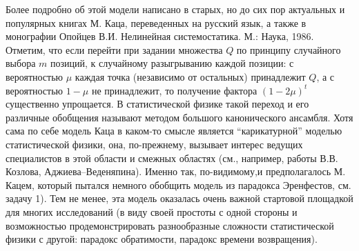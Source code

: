 \begin{remark}
 Более подробно об этой модели написано в старых, но до 
сих пор актуальных и популярных книгах М. Каца, переведенных на русский 
язык, а также в монографии {Опойцев В.И.} Нелинейная системостатика. М.: Наука, 1986. 
Отметим, что если перейти при задании множества $Q$ по принципу случайного 
выбора $m$ позиций, к случайному разыгрыванию каждой позиции: с вероятностью 
$\mu $ каждая точка (независимо от остальных) принадлежит $Q$, а с 
вероятностью $1-\mu $ не принадлежит, то получение фактора $\left( {1-2\mu } 
\right)^t$ существенно упрощается. В статистической физике такой переход и 
его различные обобщения называют методом большого канонического ансамбля. 
Хотя сама по себе модель Каца в каком-то смысле является ``карикатурной'' 
моделью статистической физики, она, 
по-прежнему, вызывает интерес ведущих специалистов в этой области и смежных 
областях (см., например, работы В.В. Козлова, Аджиева--Веденяпина). Именно так, по-видимому,и предполагалось  
 М. Кацем, который пытался немного обобщить модель из парадокса Эренфестов, 
см. задачу 1). Тем не менее, эта модель оказалась очень важной стартовой 
площадкой для многих исследований (в виду своей простоты с одной стороны и 
возможностью продемонстрировать разнообразные сложности статистической 
физики с другой: парадокс обратимости, парадокс времени возвращения).


\end{remark}

